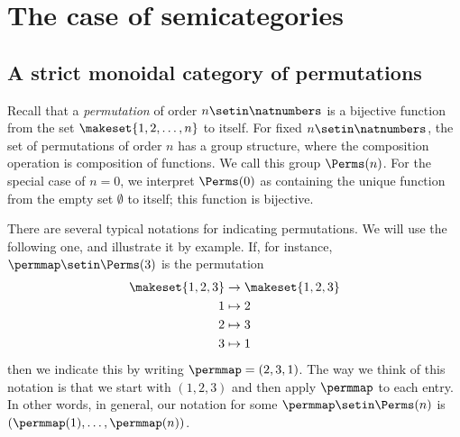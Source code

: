 
\section{The case of semicategories}
\label{sec:symmetric-stacking-semicategories}



\subsection{A strict monoidal category of permutations}
\label{sec:parallelism-and-permutations}




Recall that a \emph{permutation} of order $n \setin\natnumbers$ is a bijective function from the set $\makeset{1,2, \dots , n}$ to itself.
For fixed $n \setin\natnumbers$, the set of permutations of order $n$ has a group structure, where the composition operation is composition of functions.
We call this group $\Perms(n)$.
For the special case of $n = 0$, we interpret $\Perms(0)$ as containing the unique function from the empty set $\emptyset$ to itself; this function is bijective.

There are several typical notations for indicating permutations.
We will use the following one, and illustrate it by example.
If, for instance, $\permmap \setin \Perms(3)$ is the permutation
\begin{align*}
    \makeset{1,2,3} & \to \makeset{1,2,3} \\
    1               & \mapsto 2 \\
    2               & \mapsto 3 \\
    3               & \mapsto 1
\end{align*}
then we indicate this by writing $\permmap = (2, 3, 1)$.
The way we think of this notation is that we start with $(1, 2, 3)$ and then apply $\permmap$ to each entry.
In other words, in general, our notation for some $\permmap \setin \Perms(n)$ is $(\permmap(1), \dots, \permmap(n))$.

